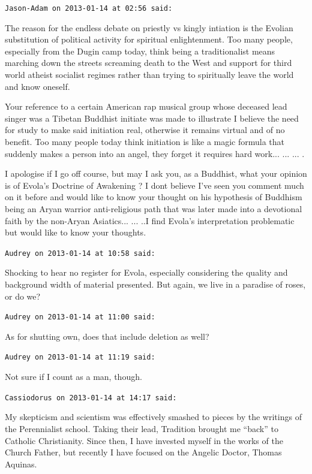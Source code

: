 \begin{footnotesize}
\begin{sffamily}
\texttt{Jason-Adam on 2013-01-14 at 02:56 said:}

The reason for the endless debate on priestly vs kingly intiation is the Evolian substitution of political activity for spiritual enlightenment. Too many people, especially from the Dugin camp today, think being a traditionalist means marching down the streets screaming death to the West and support for third world atheist socialist regimes rather than trying to spiritually leave the world and know oneself.

Your reference to a certain American rap musical group whose deceased lead singer was a Tibetan Buddhist initiate was made to illustrate I believe the need for study to make said initiation real, otherwise it remains virtual and of no benefit. Too many people today think initiation is like a magic formula that suddenly makes a person into an angel, they forget it requires hard work... ... ... .

I apologise if I go off course, but may I ask you, as a Buddhist, what your opinion is of Evola's Doctrine of Awakening ? I dont believe I've seen you comment much on it before and would like to know your thought on his hypothesis of Buddhism being an Aryan warrior anti-religious path that was later made into a devotional faith by the non-Aryan Asiatics... ... ..I find Evola's interpretation problematic but would like to know your thoughts.

\hfill

\texttt{Audrey on 2013-01-14 at 10:58 said:}

Shocking to hear no register for Evola, especially considering the quality and background width of material presented. But again, we live in a paradise of roses, or do we?

\hfill

\texttt{Audrey on 2013-01-14 at 11:00 said:}

As for shutting own, does that include deletion as well?

\hfill

\texttt{Audrey on 2013-01-14 at 11:19 said:}

Not sure if I count as a man, though.

\hfill

\texttt{Cassiodorus on 2013-01-14 at 14:17 said:}

My skepticism and scientism was effectively smashed to pieces by the writings of the Perennialist school. Taking their lead, Tradition brought me ``back'' to Catholic Christianity. Since then, I have invested myself in the works of the Church Father, but recently I have focused on the Angelic Doctor, Thomas Aquinas.


\end{sffamily}
\end{footnotesize}
